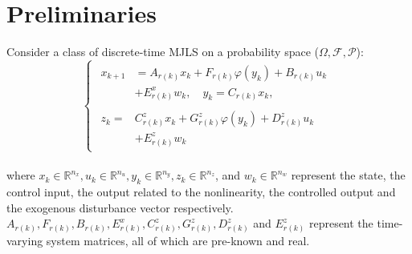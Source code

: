 \documentclass[conference]{IEEEtran}
\begin{document}




\section{Preliminaries}
Consider a class of discrete-time MJLS on a probability space ($\varOmega,\mathcal{F},\mathcal{P}$):
\begin{equation}\label{syseq}
	\left\{
	\begin{array}{lr}
		\begin{split}
			x_{k+1}&=A_{r(k)}x_k+F_{r(k)}\varphi(y_k)+B_{r(k)}u_k\\
			&+E^x_{r(k)}w_k, \quad y_k=C_{r(k)}x_k,
		\end{split}
		\\
		\begin{split}
			z_k= & C^z_{r(k)}x_k+G^z_{r(k)}\varphi(y_k)+D^z_{r(k)}u_k\\
				&+E^z_{r(k)}w_k
		\end{split}
		
	\end{array}
	\right.
\end{equation}\\
where $x_k\in\mathbb{R}^{n_x}, u_k\in\mathbb{R}^{n_u}, y_k\in\mathbb{R}^{n_y}, z_k\in\mathbb{R}^{n_z}$, and $w_k\in\mathbb{R}^{n_w}$ represent the state, the control input, the output related to the nonlinearity, the controlled output and the exogenous disturbance vector respectively. $A_{r(k)}, F_{r(k)}, B_{r(k)}, E^x_{r(k)}, C^z_{r(k)}, G^z_{r(k)}, D^z_{r(k)}$ and $E^z_{r(k)}$ represent the time-varying system matrices, all of which are pre-known and real.  
\end{document}
